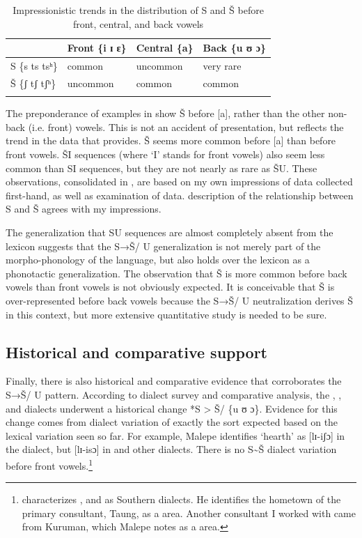 \documentclass[output=paper,newtxmath,modfonts,nonflat,hidelinks]{langsci/langscibook}
\begin{document}
\begin{table}[p]
\begin{tabularx}{\textwidth}{XXXX}
\lsptoprule
& Front \{i ɪ ɛ\} & Central \{a\} & Back \{u ʊ ɔ\}\\
\midrule
S \{s ts tsʰ\} & common & uncommon & very rare\\
Š \{ʃ tʃ tʃʰ\} & uncommon & common & common\\
\lspbottomrule
\end{tabularx}
\caption{Impressionistic trends in the distribution of S and Š before front, central, and back vowels}
\label{tab:bennett:8}
\end{table}

The preponderance of examples in  show Š before [a], rather than the other non-back (i.e. front) vowels. This is not an accident of presentation, but reflects the trend in the data that \citet{Cole1955} provides. Š seems more common before [a] than before front vowels. ŠI sequences (where ‘I’ stands for front vowels) also seem less common than SI sequences, but they are not nearly as rare as ŠU. These observations, consolidated in , are based on my own impressions of data collected first-hand, as well as examination of  data.  description of the relationship between S and Š agrees with my impressions.



The generalization that SU sequences are almost completely absent from the lexicon suggests that the S→Š/ {\longrule} U generalization is not merely part of the morpho-phonology of the language, but also holds over the lexicon as a phonotactic generalization. The observation that Š is more common before back vowels than front vowels is not obviously expected. It is conceivable that Š is over-represented before back vowels because the S→Š/ {\longrule} U neutralization derives Š in this context, but more extensive quantitative study is needed to be sure.

\subsection{Historical and comparative support}\label{sec:bennett:2.6}

Finally, there is also historical and comparative evidence that corroborates the S→Š/ {\longrule} U pattern. According to  dialect survey and comparative analysis, the , , and  dialects underwent a historical change *S > Š/ {\longrule} \{u ʊ ɔ\}. Evidence for this change comes from dialect variation of exactly the sort expected based on the lexical variation seen so far. For example, Malepe identifies ‘hearth’ as [lɪ-iʃɔ] in the  dialect, but [lɪ-isɔ] in  and other dialects. There is no S{\textasciitilde}Š dialect variation before front vowels.\footnote{\citet{Malepe1966} characterizes ,  and  as Southern dialects. He identifies the hometown of the primary consultant, Taung, as a  area. Another consultant I worked with came from Kuruman, which Malepe notes as a  area.}
\end{document}
